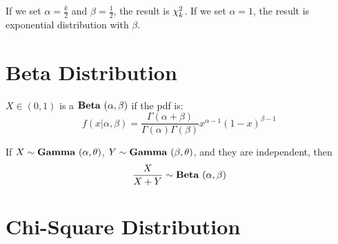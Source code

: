 If we set $\alpha = \frac{k}{2}$ and $\beta = \frac{1}{2}$, the result is $\chi^2_{k}$. If we set $\alpha = 1$, the result is exponential distribution with $\beta$.


\section{Beta Distribution}

\begin{definition}
    $X \in (0,1)$ is a  $\mathop{\bf Beta\/}~(\alpha,\beta)$ if the pdf is:
    \begin{equation}
        f(x|\alpha, \beta) = \frac{\Gamma(\alpha + \beta)}{\Gamma(\alpha) \Gamma(\beta)} x^{\alpha - 1} (1-x)^{\beta - 1}
    \end{equation}
    
    If $X \sim \mathop{\bf Gamma\/}~(\alpha,\theta)$, $Y \sim \mathop{\bf Gamma\/}~(\beta,\theta)$, and they are independent, then
    \begin{equation}
        \frac{X}{X+Y} \sim \mathop{\bf Beta\/}~(\alpha,\beta)
    \end{equation}
\end{definition}



\section{Chi-Square Distribution}

